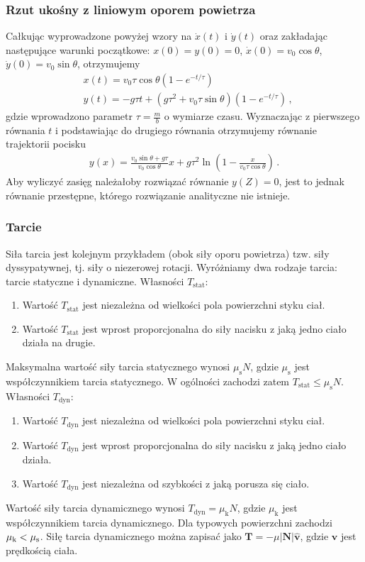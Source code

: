 \documentclass[../main.tex]{subfiles}
\begin{document}
\subsubsection*{Rzut ukośny z liniowym oporem powietrza}
Całkując wyprowadzone powyżej wzory na \(\dot x(t)\) i \(\dot y(t)\) oraz zakładając następujące warunki początkowe: \(x(0)=y(0)=0\), \(\dot x(0)=v_0\cos\theta\), \(\dot y(0)=v_0\sin\theta\), otrzymujemy
\begin{equation*}
\begin{split}
    &x(t)=v_0\tau\cos\theta\left(1-e^{-t/\tau}\right)\\
    &y(t)=-g\tau t+(g\tau^2+v_0\tau\sin\theta)\left(1-e^{-t/\tau}\right)\,,
\end{split}
\end{equation*}
gdzie wprowadzono parametr \(\tau=\frac{m}{b}\) o wymiarze czasu. Wyznaczając z pierwszego równania \(t\) i podstawiając do drugiego równania otrzymujemy równanie trajektorii pocisku
\begin{equation*}
\begin{split}
    y(x)=\frac{v_0\sin\theta+g\tau}{v_0\cos\theta}x+g\tau^2\ln\left(1-\frac{x}{v_0\tau\cos\theta}\right)\,.
\end{split}
\end{equation*}
Aby wyliczyć zasięg należałoby rozwiązać równanie \(y(Z)=0\), jest to jednak równanie przestępne, którego rozwiązanie analityczne nie istnieje.
\subsubsection{Tarcie}
Siła tarcia jest kolejnym przykładem (obok siły oporu powietrza) tzw. siły dyssypatywnej, tj. siły o niezerowej rotacji. Wyróżniamy dwa rodzaje tarcia: tarcie statyczne i dynamiczne. Własności \(T_\text{stat}\):
\begin{enumerate}
    \item Wartość \(T_\text{stat}\) jest niezależna od wielkości pola powierzchni styku ciał.
    \item Wartość \(T_\text{stat}\) jest wprost proporcjonalna do siły nacisku z jaką jedno ciało działa na drugie.
\end{enumerate}
Maksymalna wartość siły tarcia statycznego wynosi \(\mu_\text{s}N\), gdzie \(\mu_\text{s}\) jest współczynnikiem tarcia statycznego. W ogólności zachodzi zatem \(T_\text{stat}\leq\mu_\text{s}N\).
Własności \(T_\text{dyn}\):
\begin{enumerate}
    \item Wartość \(T_\text{dyn}\) jest niezależna od wielkości pola powierzchni styku ciał.
    \item Wartość \(T_\text{dyn}\) jest wprost proporcjonalna do siły nacisku z jaką jedno ciało działa.
    \item Wartość \(T_\text{dyn}\) jest niezależna od szybkości z jaką porusza się ciało.
\end{enumerate}
Wartość siły tarcia dynamicznego wynosi \(T_\text{dyn}=\mu_\text{k}N\), gdzie \(\mu_\text{k}\) jest współczynnikiem tarcia dynamicznego. Dla typowych powierzchni zachodzi \(\mu_\text k<\mu_\text s\). Siłę tarcia dynamicznego można zapisać jako \(\mathbf{T}=-\mu |\mathbf{N}|\mathbf{\hat{v}}\), gdzie \(\mathbf{v}\) jest prędkością ciała.
\end{document}

